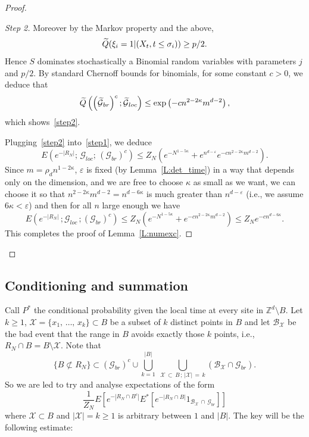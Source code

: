 \documentclass[AHL, Unicode, longabstracts, published]{cedram}
\newenvironment{step}[1]{\begin{proof}[#1]}{\let\qed\relax\end{proof}}
\newcommand{\Pmh}{P}
\newcommand*\E {{E}}
\newcommand{\cB}{\mathcal{B}}
\newcommand{\cG}{\mathcal{G}}
\newcommand{\cX}{\mathcal{X}}
\newcommand*\Q{{Q}}
\newcommand*\eps{\varepsilon}
\let\oldtilde\tilde
\renewcommand*{\tilde}[1]{\mathchoice{\widetilde{#1}}{\widetilde{#1}}{\oldtilde{#1}}{\oldtilde{#1}}}\let\oldhat\hat
\renewcommand*{\hat}[1]{\mathchoice{\widehat{#1}}{\widehat{#1}}{\oldhat{#1}}{\oldhat{#1}}}\let\oldexists\exists
\renewcommand*{\exists}{\mathrel{\oldexists}}
\begin{document}
\begin{proof}
\begin{step}{Step 2}
Moreover by the Markov property and the above,
\[
\tilde \Q(\xi_i = 1 | (X_t, t \le \sigma_i)) \ge p/2.
\]
Hence $S$ dominates stochastically a Binomial random variables with parameters $j$ and $p/2$. By standard Chernoff bounds for binomials, for some constant $c>0$, we deduce that
\[
\tilde \Q \left(\left(\tilde \cG_{br}\right)^c; \tilde \cG_{loc}\right) \le \exp \left(- c n^{2- 2\kappa} m^{d-2}\right),
\]
which shows~\eqref{step2}.

Plugging~\eqref{step2} into~\eqref{step1}, we deduce
\[
\E \left(e^{ - |R_N|} ;\,{\cG_{loc}};\, {(\cG_{br})^c}\right) \le Z_N \left(e^{- N^{1- 5\kappa}} + e^{ n^{d-\eps}} e^{- c n^{2- 2\kappa} m^{d-2}}\right).
\]
Since $m = \rho_d n^{1- 2\kappa}$, $\eps$ is fixed (by Lemma~\ref{L:det_time}) in a way that depends only on the dimension, and we are free to choose $\kappa$ as small as we want, we can choose it so that $n^{2- 2 \kappa} m^{d-2} = n^{d - 6\kappa}$ is much greater than $ n^{d- \eps}$ (i.e., we assume $6\kappa < \eps$) and then for all $n$ large enough we have
\[
\E \left(e^{ - |R_N|}\,; {\cG_{loc}}\,; {(\cG_{br})^c}\right) \le Z_N \left(e^{ - N^{1- 5 \kappa}} + e^{ - c n^{2- 2\kappa} m^{d-2}}\right) \le Z_N e^{ - c n^{d- 6 \kappa}}.
\]
This completes the proof of Lemma~\ref{L:numexc}.\qedhere
\end{step}\let\qed\relax
\end{proof}


\subsection{Conditioning and summation}
\label{S:sum}

Call $\Pmh^*$ the conditional probability given the local time at every site in $\mathbb{Z}^d \setminus B$. Let $k\ge 1$, $\cX = \{x_1,\,\ldots, \,x_k \}\subset B $ be a subset of $k$ distinct points in $B$ and let $\cB_{\cX}$ be the bad event that the range in $B$ avoids exactly those $k$ points, i.e., $R_N \cap B = B \setminus \cX$. Note that
\begin{equation}\label{eq:decomp}
\{ B \not \subset R_N \} \subset (\cG_{br})^c \cup \bigcup_{k =1}^{|B|}\;\bigcup_{\cX\, \subset\,B\,;\,|\cX|\,=\,k} (\cB_{\cX} \cap \cG_{br}).
\end{equation}
So we are led to try and analyse expectations of the form
\[
\frac1{Z_N} \E\left[e^{ - |R_N\cap B^c|} \E^*\left[e^{- | R_N \cap B| }1_{\cB_{\cX}\,\cap\,\cG_{br}}\right] \right]
\]
where $\cX \subset B$ and $| \cX | = k \ge 1$ is arbitrary between $1$ and $|B|$. The key will be the following estimate:
\end{document}
